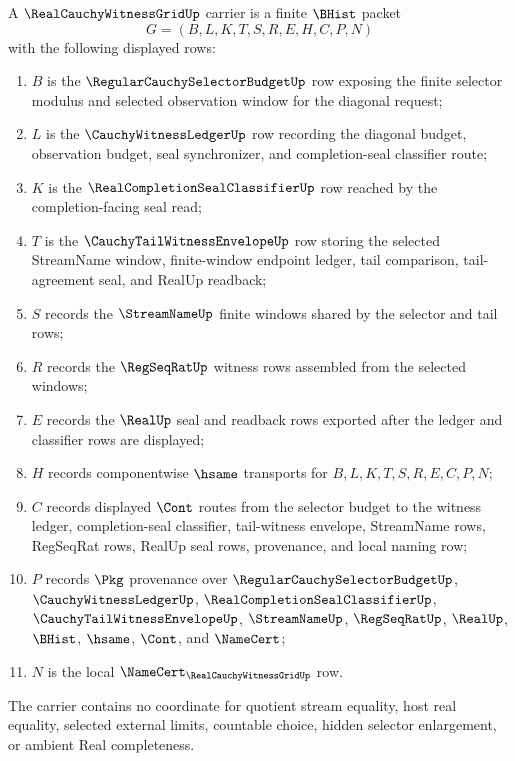 \begin{definition}
\label{def:real-cauchy-witness-grid-carrier}
A $\RealCauchyWitnessGridUp$ carrier is a finite $\BHist$ packet
$$
G=(B,L,K,T,S,R,E,H,C,P,N)
$$
with the following displayed rows:
\begin{enumerate}
\item $B$ is the $\RegularCauchySelectorBudgetUp$ row exposing the finite selector modulus and selected observation window for the diagonal request;
\item $L$ is the $\CauchyWitnessLedgerUp$ row recording the diagonal budget, observation budget, seal synchronizer, and completion-seal classifier route;
\item $K$ is the $\RealCompletionSealClassifierUp$ row reached by the completion-facing seal read;
\item $T$ is the $\CauchyTailWitnessEnvelopeUp$ row storing the selected StreamName window, finite-window endpoint ledger, tail comparison, tail-agreement seal, and RealUp readback;
\item $S$ records the $\StreamNameUp$ finite windows shared by the selector and tail rows;
\item $R$ records the $\RegSeqRatUp$ witness rows assembled from the selected windows;
\item $E$ records the $\RealUp$ seal and readback rows exported after the ledger and classifier rows are displayed;
\item $H$ records componentwise $\hsame$ transports for $B,L,K,T,S,R,E,C,P,N$;
\item $C$ records displayed $\Cont$ routes from the selector budget to the witness ledger, completion-seal classifier, tail-witness envelope, StreamName rows, RegSeqRat rows, RealUp seal rows, provenance, and local naming row;
\item $P$ records $\Pkg$ provenance over $\RegularCauchySelectorBudgetUp$, $\CauchyWitnessLedgerUp$, $\RealCompletionSealClassifierUp$, $\CauchyTailWitnessEnvelopeUp$, $\StreamNameUp$, $\RegSeqRatUp$, $\RealUp$, $\BHist$, $\hsame$, $\Cont$, and $\NameCert$;
\item $N$ is the local $\NameCert_{\RealCauchyWitnessGridUp}$ row.
\end{enumerate}
The carrier contains no coordinate for quotient stream equality, host real equality, selected external limits, countable choice, hidden selector enlargement, or ambient Real completeness.
\end{definition}

